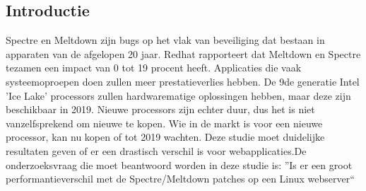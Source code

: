 \documentclass[a0,portrait]{a0poster}
\begin{document}
\begin{multicols}{2}
\color{HoGentAccent1} 
\section*{Introductie}
\color{black}
\color{black}
Spectre en Meltdown zijn bugs op het vlak van beveiliging dat bestaan in apparaten van de afgelopen 20 jaar.
Redhat rapporteert dat Meltdown en Spectre tezamen een impact van 0 tot 19 procent
heeft. Applicaties die vaak systeemoproepen doen zullen meer prestatieverlies hebben.\newline
De 9de generatie Intel ’Ice Lake’ processors zullen hardwarematige oplossingen hebben, maar deze zijn beschikbaar in 2019.
\newline
Nieuwe processors zijn echter duur, dus het is niet vanzelfsprekend om nieuwe te kopen.\newline
Wie in de markt is voor een nieuwe processor, kan nu kopen of tot 2019 wachten. Deze studie moet duidelijke resultaten geven of er een drastisch verschil is voor webapplicaties.\newline De onderzoeksvraag die moet beantwoord worden in deze studie is:\newline\newline
''Is er een groot performantieverschil met de Spectre/Meltdown patches op een Linux
webserver``

\color{Black} %
\color{HoGentAccent1} 

\end{multicols}
\end{document}
